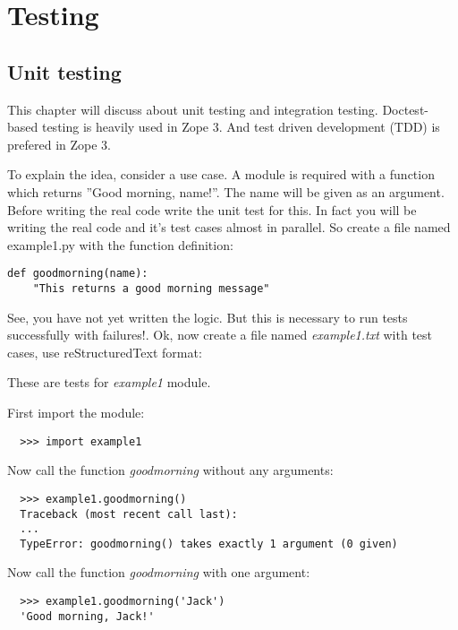\chapter{Testing}
\label{chap:Testing}

\section{Unit testing}

This chapter will discuss about unit testing and integration testing.
Doctest-based testing is heavily used in Zope 3.  And test driven
development (TDD) is prefered in Zope 3.

To explain the idea, consider a use case. A module is required with a
function which returns ''Good morning, name!''.  The name will be
given as an argument.  Before writing the real code write the unit
test for this.  In fact you will be writing the real code and it's
test cases almost in parallel.  So create a file named example1.py
with the function definition:

{\footnotesize
\begin{verbatim}
def goodmorning(name):
    "This returns a good morning message"
\end{verbatim}
}

See, you have not yet written the logic. But this is necessary to run
tests successfully with failures!. Ok, now create a file named
\emph{example1.txt} with test cases, use reStructuredText format:

These are tests for \emph{example1} module.

First import the module:

{\footnotesize
\begin{verbatim}
  >>> import example1
\end{verbatim}
}

Now call the function \emph{goodmorning} without any arguments:

{\footnotesize
\begin{verbatim}
  >>> example1.goodmorning()
  Traceback (most recent call last):
  ...
  TypeError: goodmorning() takes exactly 1 argument (0 given)
\end{verbatim}
}

Now call the function \emph{goodmorning} with one argument:

{\footnotesize
\begin{verbatim}
  >>> example1.goodmorning('Jack')
  'Good morning, Jack!'
\end{verbatim}
}

